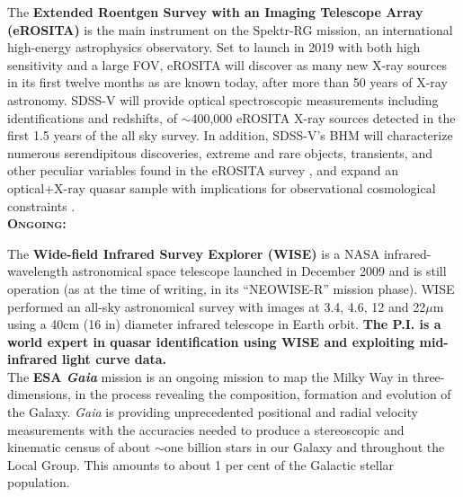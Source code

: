 \begin{framed}
The {\bf Extended Roentgen Survey with an Imaging Telescope Array
(eROSITA)} is the main instrument on the Spektr-RG mission, an
international high-energy astrophysics observatory.  Set to launch in
2019 with both high sensitivity and a large FOV, eROSITA will discover
as many new X-ray sources in its first twelve months as are known
today, after more than 50 years of X-ray astronomy.  SDSS-V will
provide optical spectroscopic measurements including identifications
and redshifts, of $\sim$400,000 eROSITA X-ray sources detected in the
first 1.5 years of the all sky survey.  In addition, SDSS-V's BHM will
characterize numerous serendipitous discoveries, extreme and rare
objects, transients, and other peculiar variables found in the eROSITA
survey \citep{Merloni2012}, and expand an optical+X-ray quasar sample
with implications for observational cosmological constraints
\citep[e.g.][]{Risaliti_Lusso2015}.\\


\noindent
\textbf{\textsc{Ongoing:}} 

The {\bf Wide-field Infrared Survey Explorer (WISE)} is a NASA
infrared-wavelength astronomical space telescope launched in December
2009 and is still operation (as at the time of writing, in its
``NEOWISE-R'' mission phase). WISE performed an all-sky astronomical
survey with images at 3.4, 4.6, 12 and 22$\mu$m using a 40cm (16 in)
diameter infrared telescope in Earth orbit.  {\bf The P.I. is a world
expert in quasar identification using WISE \citep[e.g., ][]{Ross2012,
Ross2015, Timlin2016, Timlin2018} and exploiting mid-infrared light
curve data.} \\

The \textbf{ESA {\it Gaia}} mission is an ongoing mission to map 
the Milky Way in three-dimensions, in the process
revealing the composition, formation and evolution of the Galaxy. {\it Gaia} 
is providing unprecedented positional and radial velocity measurements
with the accuracies needed to produce a stereoscopic and kinematic
census of about $\sim$one billion stars in our Galaxy and throughout
the Local Group. This amounts to about 1 per cent of the Galactic
stellar population.

\end{framed}
